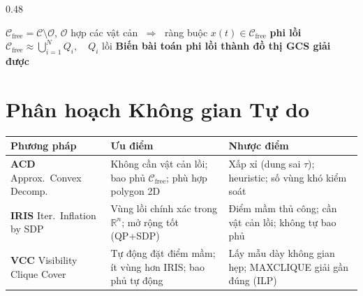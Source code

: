 \documentclass[final]{beamer}
\begin{document}
\begin{frame}[t]
\begin{columns}[t,totalwidth=\textwidth]
\begin{column}{0.48\textwidth}
      \begin{keybox}
        \centering
        $\mathcal{C}_{\mathrm{free}}=\mathcal{C}\setminus\mathcal{O}$,\;
        $\mathcal{O}$ hợp các vật cản
        $\;\Rightarrow\;$
        ràng buộc $x(t)\in\mathcal{C}_{\mathrm{free}}$ \textbf{phi lồi}\\[0.25em]
        $\mathcal{C}_{\mathrm{free}} \approx \displaystyle\bigcup_{i=1}^{N} Q_i,\quad Q_i \text{ lồi}$
        \qquad
        {\small\textbf{Biến bài toán phi lồi thành đồ thị GCS giải được}}
      \end{keybox}

      \section{Phân hoạch Không gian Tự do}

       {\small
        \renewcommand{\arraystretch}{1.15}
        \begin{tabular}{@{}p{9cm}p{13.5cm}p{14cm}@{}}
          \toprule
          \textbf{Phương pháp} & \textbf{Ưu điểm}                                                               & \textbf{Nhược điểm} \\
          \midrule
          \textbf{ACD}\newline
          {\footnotesize Approx.\ Convex Decomp.}
                               & Không cần vật cản lồi; bao phủ $\mathcal{C}_\mathrm{free}$; phù hợp polygon 2D
                               & Xấp xỉ (dung sai $\tau$); heuristic; số vùng khó kiểm soát                                           \\[4pt]
          \textbf{IRIS}\newline
          {\footnotesize Iter.\ Inflation by SDP}
                               & Vùng lồi chính xác trong $\mathbb{R}^n$; mở rộng tốt (QP+SDP)
                               & Điểm mầm thủ công; cần vật cản lồi; không tự bao phủ                                                 \\[4pt]
          \textbf{VCC}\newline
          {\footnotesize Visibility Clique Cover}
                               & Tự động đặt điểm mầm; ít vùng hơn IRIS; bao phủ tự động
                               & Lấy mẫu dày không gian hẹp; MAXCLIQUE giải gần đúng (ILP)                                            \\
          \bottomrule
        \end{tabular}
       }


\end{column}
\end{columns}
\end{frame}
\end{document}
